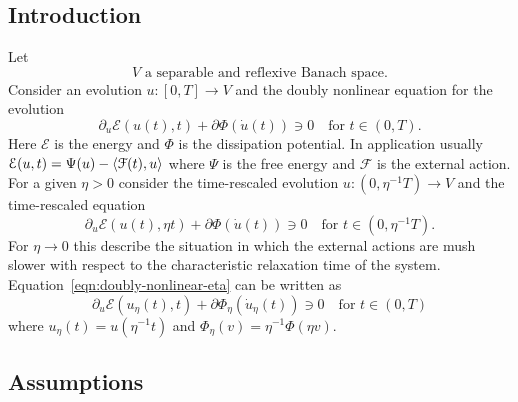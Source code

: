 \documentclass[letterpaper,oneside]{amsart}
\numberwithin{equation}{section}
\theoremstyle{definition}
\DeclarePairedDelimiter{\dual}{\langle}{\rangle}
\begin{document}
\subsection{Introduction}
Let
\begin{equation}
\label{eqn:bv-space}
\text{$V$ a separable and reflexive Banach space}.
\tag{$V$}
\end{equation}
Consider an evolution $u\colon[0,T]\to V$ and the doubly nonlinear equation for the evolution
\begin{equation}
\label{eqn:doubly-nonlinear}
\partial_u\mathcal{E}(u(t),t)+\partial\Phi(\dot u(t))\ni0\quad\text{for $t\in(0,T)$}.
\end{equation}
Here $\mathcal{E}$ is the energy and $\Phi$ is the dissipation potential. In application usually $\mathcal{E}(u,t)=\Psi(u)-\dual{\mathcal F(t),u}$ where $\Psi$ is the free energy and $\mathcal{F}$ is the external action. For a given $\eta>0$ consider the time-rescaled evolution $u\colon(0,\eta^{-1}T)\to V$ and the time-rescaled equation
\begin{equation}
\label{eqn:doubly-nonlinear-eta}
\partial_u\mathcal{E}(u(t),\eta t)+\partial\Phi(\dot u(t))\ni0\quad\text{for $t\in(0,\eta^{-1}T)$}.
\end{equation}
For $\eta\to0$ this describe the situation in which the external actions are mush slower with respect to the characteristic relaxation time of the system. Equation~\eqref{eqn:doubly-nonlinear-eta} can be written as
\begin{equation}
\label{eqn:doubly-nonlinear-rescaled}
\partial_u\mathcal{E}(u_\eta(t),t)+\partial\Phi_\eta(\dot u_\eta(t))\ni0\quad\text{for $t\in(0,T)$}
\end{equation}
where $u_\eta(t)=u(\eta^{-1}t)$ and $\Phi_\eta(v)=\eta^{-1}\Phi(\eta v)$.

\subsection{Assumptions}
\end{document}
